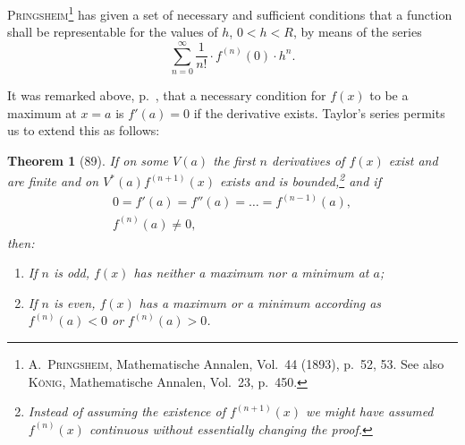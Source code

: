 \documentclass[a4paper,12pt]{book}[2004/02/16]
\providecommand{\hypertarget}[2]{#2}
\theoremstyle{ilemma}
\theoremstyle{itheorem}
\newtheorem{theorem}{Theorem}
\theoremstyle{iother}
\theoremstyle{icorollary}
\theoremstyle{numcorollary}
\theoremstyle{idefinition}
\begin{document}
\textsc{Pringsheim}\footnote{%
  \textsc{A.~Pringsheim}, Mathematische Annalen, Vol.~44 (1893), p.\
  52, 53.  See also \textsc{K\"onig}, Mathematische Annalen, Vol.~23,
  p.~450.}
has given a set of necessary and sufficient conditions that a function
shall be representable for the values of $h$, $0<h<R$, by means of the
series
\[
  \sum_{n=0}^\infty \frac{1}{n!} \cdot f^{(n)}(0) \cdot h^n.
\]

It was remarked above, p.~\pageref{t83p131}, that a necessary condition for $f(x)$
to be a maximum at $x = a$ is $f'(a) = 0$ if the derivative exists.
Taylor's series permits us to extend this as follows:

\begin{theorem}[89]\hypertarget{thm89}{}
If on some $V(a)$ the first $n$ derivatives of $f(x)$ exist and are
finite and on $V^*(a) f^{(n+1)}(x)$ exists and is bounded,\footnote{%
    Instead of assuming the existence of $f^{(n+1)}(x)$ we might have
    assumed $f^{(n)}(x)$ continuous without essentially changing the
    proof.}
and if
\begin{gather*}
  0=f'(a)=f''(a)=\ldots=f^{(n-1)}(a),\\
  f^{(n)}(a)\neq0,
\end{gather*}
\emph{then}:
\begin{enumerate}
\item[\textnormal{(1)}] If $n$ is odd, $f(x)$ has neither a maximum nor a minimum
at $a$;

\item[\textnormal{(2)}] If $n$ is even, $f(x)$ has a maximum or a minimum according
as $f^{(n)}(a)<0$ or $f^{(n)}(a)>0$.
\end{enumerate}
\end{theorem}
\end{document}
